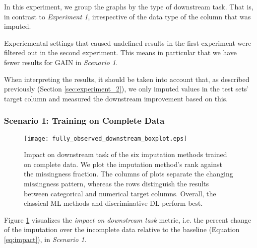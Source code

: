 In this experiment, we group the graphs by the type of downstream task. That is, in contrast to \textit{Experiment 1}, irrespective of the data type of the column that was imputed.

Experiemental settings that caused undefined results in the first experiment were filtered out in the second experiment. This means in particular that we have fewer results for GAIN in \textit{Scenario 1}.

When interpreting the results, it should be taken into account that, as described previously (Section \ref{sec:experiment_2}), we only imputed values in the test sets’ target column  and measured the downstream improvement based on this.


\subsubsection{Scenario 1: Training on Complete Data}


\begin{figure}\centering
	\texttt{[image: fully\_observed\_downstream\_boxplot.eps]}

	\caption[Downstream Ranks - Fully Observed]{Impact on downstream task of the six imputation methods trained on complete data. We plot the imputation method's rank against the missingness fraction. The columns of plots separate the changing missingness pattern, whereas the rows distinguish the results between categorical and numerical target columns. Overall, the classical ML methods and discriminative DL perform best.
    }
	\label{fig:fully_observed_downstream_boxplot}
\end{figure}

Figure \ref{fig:fully_observed_downstream_boxplot} visualizes the \textit{impact on downstream task} metric, i.e. the percent change of the imputation over the incomplete data relative to the baseline (Equation \ref{eq:impact}), in \textit{Scenario 1}.

